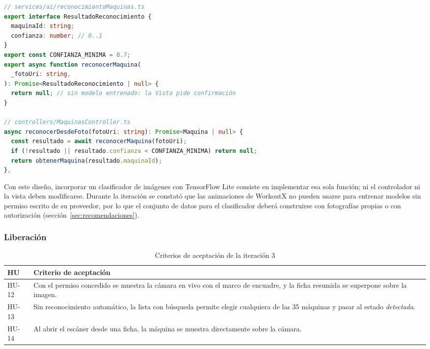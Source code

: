 \begin{lstlisting}[language=TypeScript, caption={Contrato del reconocimiento de máquinas y su uso en el controlador}, label={lst:reconocimiento}]
// services/ai/reconocimientoMaquinas.ts
export interface ResultadoReconocimiento {
  maquinaId: string;
  confianza: number; // 0..1
}
export const CONFIANZA_MINIMA = 0.7;
export async function reconocerMaquina(
  _fotoUri: string,
): Promise<ResultadoReconocimiento | null> {
  return null; // sin modelo entrenado: la Vista pide confirmación
}

// controllers/MaquinasController.ts
async reconocerDesdeFoto(fotoUri: string): Promise<Maquina | null> {
  const resultado = await reconocerMaquina(fotoUri);
  if (!resultado || resultado.confianza < CONFIANZA_MINIMA) return null;
  return obtenerMaquina(resultado.maquinaId);
},
\end{lstlisting}

Con este diseño, incorporar un clasificador de imágenes con TensorFlow Lite
consiste en implementar esa sola función; ni el controlador ni la vista deben
modificarse. Durante la iteración se constató que las animaciones de WorkoutX
no pueden usarse para entrenar modelos sin permiso escrito de su proveedor,
por lo que el conjunto de datos para el clasificador deberá construirse con
fotografías propias o con autorización (sección~\ref{sec:recomendaciones}).

\subsubsection{Liberación}

\begin{table}[H]
\centering
\caption{Criterios de aceptación de la iteración 3}
\label{tab:ca-it3}
\begin{tabularx}{\textwidth}{|L{1.3cm}|Y|}
\hline
{} \textbf{HU} & \textbf{Criterio de aceptación} \\
\hline
HU-12 & Con el permiso concedido se muestra la cámara en vivo con el marco
de encuadre, y la ficha resumida se superpone sobre la imagen. \\ \hline
HU-13 & Sin reconocimiento automático, la lista con búsqueda permite elegir
cualquiera de las 35 máquinas y pasar al estado \emph{detectada}. \\ \hline
HU-14 & Al abrir el escáner desde una ficha, la máquina se muestra
directamente sobre la cámara. \\
\hline
\end{tabularx}
\end{table}


